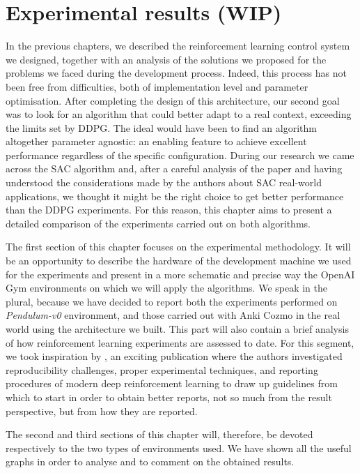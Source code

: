\chapter{Experimental results (WIP)} \label{ch:ch5}

In the previous chapters, we described the reinforcement learning control system we designed, together with an analysis of the solutions we proposed for the problems we faced during the development process.
Indeed, this process has not been free from difficulties, both of implementation level and parameter optimisation.
After completing the design of this architecture, our second goal was to look for an algorithm that could better adapt to a real context, exceeding the limits set by DDPG.
The ideal would have been to find an algorithm altogether parameter agnostic: an enabling feature to achieve excellent performance regardless of the specific configuration.
During our research we came across the SAC algorithm and, after a careful analysis of the paper and having understood the considerations made by the authors about SAC real-world applications, we thought it might be the right choice to get better performance than the DDPG experiments.
For this reason, this chapter aims to present a detailed comparison of the experiments carried out on both algorithms.

The first section of this chapter focuses on the experimental methodology.
It will be an opportunity to describe the hardware of the development machine we used for the experiments and present in a more schematic and precise way the OpenAI Gym environments on which we will apply the algorithms.
We speak in the plural, because we have decided to report both the experiments performed on \textit{Pendulum-v0} environment, and those carried out with Anki Cozmo in the real world using the architecture we built.
This part will also contain a brief analysis of how reinforcement learning experiments are assessed to date.
For this segment, we took inspiration by \cite{henderson2018deep}, an exciting publication where the authors investigated reproducibility challenges, proper experimental techniques, and reporting procedures of modern deep reinforcement learning to draw up guidelines from which to start in order to obtain better reports, not so much from the result perspective, but from how they are reported.

The second and third sections of this chapter will, therefore, be devoted respectively to the two types of environments used.
We have shown all the useful graphs in order to analyse and to comment on the obtained results.

